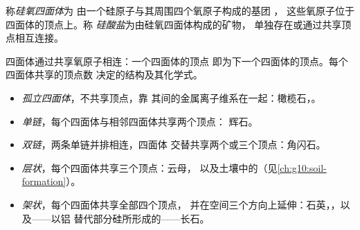 \begin{definition}\label{def:g11:minerals:silicate}
称\emph{硅氧四面体}为
由一个硅原子与其周围四个氧原子构成的基团 ，
这些氧原子位于四面体的顶点上。称
\emph{硅酸盐}为由硅氧四面体构成的矿物，
单独存在或通过共享顶点相互连接。
\end{definition}

四面体通过共享氧原子相连：一个四面体的顶点
即为下一个四面体的顶点。每个四面体共享的顶点数
决定的结构及其化学式。
\begin{itemize}
  \item \emph{孤立四面体}，不共享顶点，靠
        其间的金属离子维系在一起：橄榄石，。
  \item \emph{单链}，每个四面体与相邻四面体共享两个顶点：
        辉石。
  \item \emph{双链}，两条单链并排相连，四面体
        交替共享两个或三个顶点：角闪石。
  \item \emph{层状}，每个四面体共享三个顶点：云母，
        以及土壤中的（见\cref{ch:g10:soil-formation}）。
  \item \emph{架状}，每个四面体共享全部四个顶点，
        并在空间三个方向上延伸：石英，，以及——以铝
        替代部分硅所形成的——长石。
\end{itemize}

